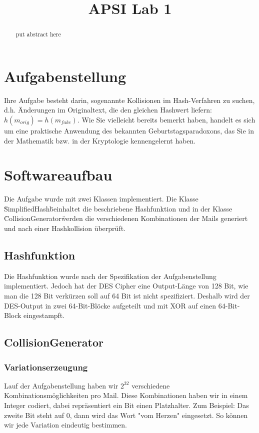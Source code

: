 \documentclass[12pt]{scrartcl}
\title{ %
APSI Lab 1
\vspace{0.2cm}
}
\begin{document}
 \maketitle
 \thispagestyle{firststyle}
 \pagestyle{firststyle}
 \begin{abstract}
 \begin{center}
  put abstract here  
 \end{center}
 \vspace{0.5cm}
\hrulefill
\end{abstract}

 \pagestyle{documentstyle}
 \tableofcontents
 \pagebreak
\section{Aufgabenstellung}
Ihre Aufgabe besteht darin, sogenannte Kollisionen im Hash-Verfahren zu suchen, d.h. Änderungen
im Originaltext, die den gleichen Hashwert liefern: $ h(m_{orig}) = h(m_{fake})$. Wie Sie vielleicht
bereits bemerkt haben, handelt es sich um eine praktische Anwendung des bekannten
Geburtstagsparadoxons, das Sie in der Mathematik bzw. in der Kryptologie kennengelernt
haben.

\section{Softwareaufbau}
Die Aufgabe wurde mit zwei Klassen implementiert. Die Klasse \"SimplifiedHash\" beinhaltet die beschriebene Hashfunktion und in der Klasse \"CollisionGenerator\" werden die verschiedenen Kombinationen der Mails generiert und nach einer Hashkollision überprüft.

\subsection{Hashfunktion}
Die Hashfunktion wurde nach der Spezifikation der Aufgabenstellung implementiert. Jedoch hat der DES Cipher eine Output-Länge von  128 Bit, wie man die 128 Bit verkürzen soll auf 64 Bit ist nicht spezifiziert. Deshalb wird der DES-Output in zwei 64-Bit-Blöcke aufgeteilt und mit XOR auf einen 64-Bit-Block eingestampft.

\subsection{CollisionGenerator}
\subsubsection{Variationserzeugung}
Lauf der Aufgabenstellung haben wir $2^{32}$ verschiedene Kombinationsmöglichkeiten pro Mail. Diese Kombinationen haben wir in einem Integer codiert, dabei repräsentiert ein Bit einen Platzhalter.   Zum Beispiel: Das zweite Bit steht auf 0, dann wird das Wort "vom Herzen" eingesetzt. So können wir jede Variation eindeutig bestimmen.
\end{document}
